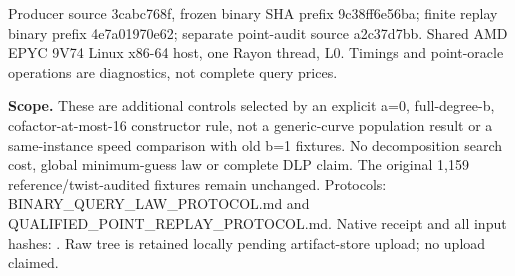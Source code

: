 \documentclass[10pt]{article}
\begin{document}
Producer source 3cabc768f, frozen binary SHA prefix 9c38ff6e56ba; finite
replay binary prefix 4e7a01970e62; separate point-audit source a2c37d7bb.
Shared AMD EPYC 9V74 Linux x86-64 host, one Rayon thread, L0. Timings and
point-oracle operations are diagnostics, not complete query prices.

\textbf{Scope.} These are additional controls selected by an explicit a=0,
full-degree-b, cofactor-at-most-16 constructor rule, not a generic-curve
population result or a same-instance speed comparison with old b=1 fixtures.
No decomposition search cost, global minimum-guess law or complete DLP claim.
The original 1,159 reference/twist-audited fixtures remain unchanged.
Protocols: BINARY_QUERY_LAW_PROTOCOL.md and QUALIFIED_POINT_REPLAY_PROTOCOL.md.
Native receipt and all input hashes:
.
Raw tree is retained locally pending artifact-store upload; no upload claimed.
\end{document}
